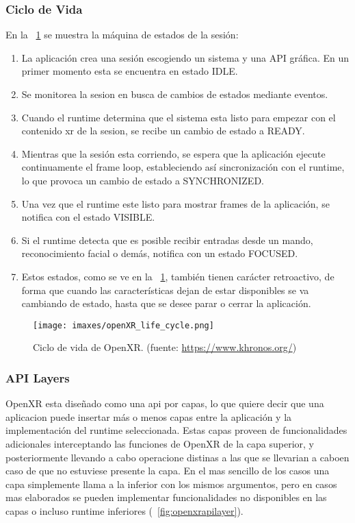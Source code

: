 \subsubsection{Ciclo de Vida}
En la \figurename~\ref{fig:openxrlifecycle} se muestra la máquina de estados de la sesión:
\begin{enumerate}
    \item La aplicación crea una sesión escogiendo un sistema y una API gráfica. En un primer momento esta se encuentra en estado IDLE.
    \item Se monitorea la sesion en busca de cambios de estados mediante eventos.
    \item Cuando el runtime determina que el sistema esta listo para empezar con el contenido \acrshort{xr} de la sesion, se recibe un cambio de estado a READY.
    \item Mientras que la sesión esta corriendo, se espera que la aplicación ejecute continuamente el frame loop, estableciendo así sincronización con el runtime, lo que provoca un cambio de estado a SYNCHRONIZED.
    \item Una vez que el runtime este listo para mostrar frames de la aplicación, se notifica con el estado VISIBLE.
    \item Si el runtime detecta que es posible recibir entradas desde un mando, reconocimiento facial o demás, notifica con un estado FOCUSED.
    \item Estos estados, como se ve en la \figurename~\ref{fig:openxrlifecycle}, también tienen carácter retroactivo, de forma que cuando las características dejan de estar disponibles se va cambiando de estado, hasta que se desee parar o cerrar la aplicación.
    
\end{enumerate}

\begin{figure}
  \centering
  \texttt{[image: imaxes/openXR\_life\_cycle.png]}
  \caption{Ciclo de vida de OpenXR. (fuente: \href{https://www.khronos.org/}{https://www.khronos.org/})}
  \label{fig:openxrlifecycle}
\end{figure}

\subsubsection{API Layers}
OpenXR esta diseñado como una \acrshort{api} por capas, lo que quiere decir que una aplicacion puede insertar más o menos capas entre la aplicación y la implementación del runtime seleccionada. Estas capas proveen de funcionalidades adicionales interceptando las funciones de OpenXR de la capa superior, y posteriormente llevando a cabo operacione distinas a las que se llevarian a caboen caso de que no estuviese presente la capa. En el mas sencillo de los casos una capa simplemente llama a la inferior con los mismos argumentos, pero en casos mas elaborados se pueden implementar funcionalidades no disponibles en las capas o incluso runtime inferiores (\figurename~\ref{fig:openxrapilayer}).

